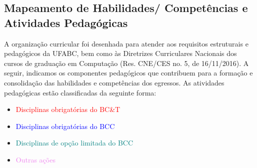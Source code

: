 \subsection{Mapeamento de Habilidades/ Competências e Atividades Pedagógicas}
A organização curricular foi desenhada para atender aos requisitos estruturais e pedagógicos da UFABC, bem como às Diretrizes Curriculares Nacionais dos cursos de graduação em Computação (Res. CNE/CES no. 5, de 16/11/2016). A seguir, indicamos os componentes pedagógicos que contribuem para a formação e consolidação das habilidades e competências dos egressos. As atividades pedagógicas estão classificadas da seguinte forma:

\begin{itemize}
	\item \textcolor{red}{Disciplinas obrigatórias do BC\&T}
	\item \textcolor{blue}{Disciplinas obrigatórias do BCC}
	\item \textcolor{teal}{Disciplinas de opção limitada do BCC}
	\item \textcolor{violet}{Outras ações}
\end{itemize}




